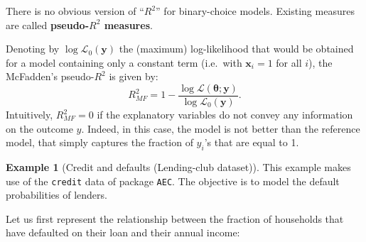\documentclass[
  12pt,
]{book}
\newenvironment{Shaded}{\begin{snugshade}}{\end{snugshade}}
\newcommand{\AttributeTok}[1]{\textcolor[rgb]{0.77,0.63,0.00}{#1}}
\newcommand{\DecValTok}[1]{\textcolor[rgb]{0.00,0.00,0.81}{#1}}
\newcommand{\FunctionTok}[1]{\textcolor[rgb]{0.00,0.00,0.00}{#1}}
\newcommand{\NormalTok}[1]{#1}
\newcommand{\OtherTok}[1]{\textcolor[rgb]{0.56,0.35,0.01}{#1}}
\newcommand{\SpecialCharTok}[1]{\textcolor[rgb]{0.00,0.00,0.00}{#1}}
\newcommand{\StringTok}[1]{\textcolor[rgb]{0.31,0.60,0.02}{#1}}
\theoremstyle{definition}
\theoremstyle{definition}
\newtheorem{example}{Example}[chapter]
\theoremstyle{definition}
\theoremstyle{definition}
\theoremstyle{remark}
\begin{document}
There is no obvious version of ``\(R^2\)'' for binary-choice models. Existing measures are called \textbf{pseudo-\(R^2\) measures}.

Denoting by \(\log \mathcal{L}_0(\mathbf{y})\) the (maximum) log-likelihood that would be obtained for a model containing only a constant term (i.e.~with \(\mathbf{x}_i = 1\) for all \(i\)), the McFadden's pseudo-\(R^2\) is given by:
\[
R^2_{MF} = 1 - \frac{\log \mathcal{L}(\boldsymbol\theta;\mathbf{y})}{\log \mathcal{L}_0(\mathbf{y})}.
\]
Intuitively, \(R^2_{MF}=0\) if the explanatory variables do not convey any information on the outcome \(y\). Indeed, in this case, the model is not better than the reference model, that simply captures the fraction of \(y_i\)'s that are equal to 1.

\begin{example}[Credit and defaults (Lending-club dataset)]
\protect\hypertarget{exm:creditProbit}{}\label{exm:creditProbit}This example makes use of the \texttt{credit} data of package \texttt{AEC}. The objective is to model the default probabilities of lenders.

Let us first represent the relationship between the fraction of households that have defaulted on their loan and their annual income:

\begin{Shaded}
\end{Shaded}


\end{example}
\end{document}
